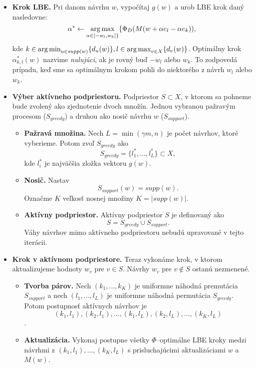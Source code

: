 \begin{itemize}
	\item \textbf{Krok LBE.} Pri danom návrhu $w$, vypočítaj $g(w)$ a urob LBE krok daný nasledovne: $$\alpha^* \leftarrow \operatorname*{arg\,max}_{\alpha \in [-w_l, w_k] \}} \{ \Phi_D (M(w+\alpha e_l -\alpha e_k)),$$ kde 
	$k \in \operatorname*{arg\,min}_{u \in supp(w)} \{ d_u(w)\}, l \in \operatorname*{arg\,max}_{v \in X} \{ d_v(w)\}$. Optimálny krok $\alpha^*_{k,l}(w)$ nazvime \textit{nulujúci}, ak je rovný buď $-w_l$ alebo $w_k$. To zodpovedá prípadu, keď sme sa optimálnym krokom pohli do niektorého z návrh $w_l$ alebo $w_k$.

	\item \textbf{Výber aktívneho podpriestoru.} Podpriestor $S \subset X$, v ktorom sa pohneme bude zvolený ako zjednotenie dvoch množín. Jednou vybranou pažravým procesom ($S_{greedy}$) a druhou ako nosič návrhu $w$ ($S_{support}$).
	\begin{itemize}
		\item \textbf{Pažravá množina.} Nech $L=\min (\gamma m, n)$ je počet návrhov, ktoré vyberieme. Potom zvoľ $S_{greedy}$ ako $$S_{greedy} = \{l_1^*, \dots, l_L^* \} \subset X,$$ kde $l_i^*$ je najväčšia zložka vektoru $g(w)$.
		\item \textbf{Nosič.} Nastav $$S_{support}(w)=supp(w).$$ Označme $K$ veľkosť nosnej množiny $K= |supp(w)|$.
		\item \textbf{Aktívny podpriestor.} Aktívny podpriestor $S$ je definovaný ako $$S=S_{greedy} \cup S_{support}.$$ Váhy návrhov mimo aktívneho podpriestoru nebudú upravované v tejto iterácii.
	\end{itemize}

	\item \textbf{Krok v aktívnom podpriestore.} Teraz vykonáme krok, v ktorom aktualizujeme hodnoty $w_v$ pre $v \in S$. Návrhy $w_v$ pre $v \not \in S$ ostanú nezmenené.
	\begin{itemize}
		\item \textbf{Tvorba párov.} Nech $(k_1, \dots, k_K)$ je uniformne náhodná premutácia $S_{support}$ a nech $(l_1, \dots, l_L)$ je uniformne náhodná permutácia $S_{greedy}$. Potom postupnosť aktívnych návrhov je $$ (k_1,l_1), (k_2, l_1), \dots, (k_1, l_L), (k_2,l_L), \dots, (k_K, l_L) $$.
		\item \textbf{Aktualizácia.} Vykonaj postupne všetky $\Phi$--optimálne LBE kroky medzi návrhmi z $ (k_1,l_1), \dots, (k_K, l_L)$ s prisluchajúcimi aktualizáciami $w$ a $M(w)$.
	\end{itemize}
\end{itemize}


